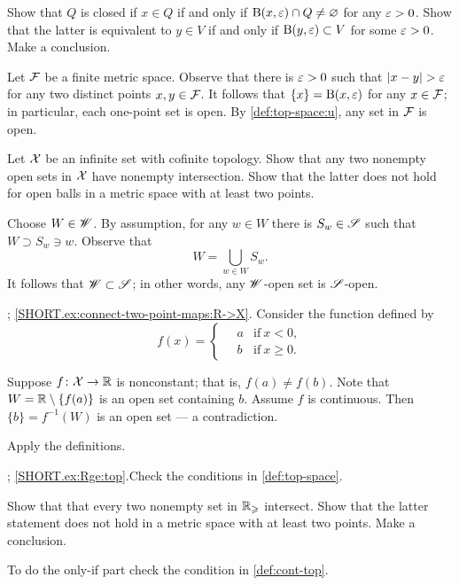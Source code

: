 \begin{multicols}{2}
Show that $Q$ is closed if $x\in Q$ if and only if $\mathrm{B}(x,\varepsilon)\cap Q\ne\varnothing$ for any $\varepsilon>0$.
Show that the latter is equivalent to $y\in V$ if and only if $\mathrm{B}(y,\varepsilon)\subset V$ for some $\varepsilon>0$.
Make a conclusion.

Let $\mathcal{F}$ be a finite metric space.
Observe that there is $\varepsilon>0$ such that $|x-y|>\eps$ for any two distinct points $x,y\in\mathcal{F}$.
It follows that $\{x\}=\mathrm{B}(x,\varepsilon)$ for any $x\in\mathcal{F}$;
in particular, each one-point set is open.
By \ref{def:top-space:u}, any set in $\mathcal{F}$ is open.


Let $\mathcal{X}$ be an infinite set with cofinite topology.
Show that any two nonempty open sets in $\mathcal{X}$ have nonempty intersection.
Show that the latter does not hold for open balls in a metric space with at least two points.

Choose $W\in \mathscr{W}$.
By assumption, for any $w\in W$ there is $S_w\in \mathscr{S}$ such that $W\supset S_w\ni w$.
Observe that 
\[W=\bigcup_{w\in W}S_w.\]
It follows that $\mathscr{W}\subset \mathscr{S}$;
in other words, any $\mathscr{W}$-open set is $\mathscr{S}$-open.

\parbf{\ref{ex:connect-two-point-maps}}; \ref{SHORT.ex:connect-two-point-maps:R->X}.
Consider the function defined by
\[
f(x)=
\begin{cases}
\quad a &\text{if}\ x< 0,
\\
\quad b &\text{if}\ x\ge 0.
\end{cases}
\]

 Suppose $f\colon\mathcal{X}\to \mathbb{R}$ is nonconstant;
that is, $f(a)\ne f(b)$.
Note that $W=\mathbb{R}\setminus\{f(a)\}$ is an open set containing $b$.
Assume $f$ is continuous.
Then $\{b\}=f^{-1}(W)$ is an open set --- a contradiction.

Apply the definitions.

\parbf{\ref{ex:Rge}}; \ref{SHORT.ex:Rge:top}.Check the conditions in \ref{def:top-space}.

Show that that every two nonempty set in $\mathbb{R}_\geqslant$ intersect.
Show that the latter statement does not hold in a metric space with at least two points.
Make a conclusion.

To do the only-if part check the condition in \ref{def:cont-top}.


\end{multicols}
